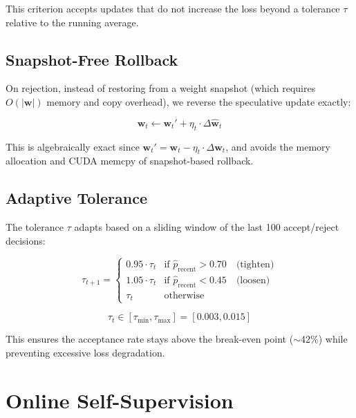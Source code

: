 \documentclass[conference]{IEEEtran}
\begin{document}
This criterion accepts updates that do not increase the loss beyond a tolerance $\tau$ relative to the running average.

\subsection{Snapshot-Free Rollback}

On rejection, instead of restoring from a weight snapshot (which requires $O(|\mathbf{w}|)$ memory and copy overhead), we reverse the speculative update exactly:

\begin{equation}
\mathbf{w}_t \gets \mathbf{w}_t' + \eta_t \cdot \Delta\hat{\mathbf{w}}_t
\label{eq:rollback}
\end{equation}

This is algebraically exact since $\mathbf{w}_t' = \mathbf{w}_t - \eta_t \cdot \Delta\hat{\mathbf{w}}_t$, and avoids the memory allocation and CUDA memcpy of snapshot-based rollback.

\subsection{Adaptive Tolerance}

The tolerance $\tau$ adapts based on a sliding window of the last 100 accept/reject decisions:

\begin{equation}
\tau_{t+1} = \begin{cases}
0.95 \cdot \tau_t & \text{if } \hat{p}_{\mathrm{recent}} > 0.70 \quad \text{(tighten)} \\
1.05 \cdot \tau_t & \text{if } \hat{p}_{\mathrm{recent}} < 0.45 \quad \text{(loosen)} \\
\tau_t & \text{otherwise}
\end{cases}
\label{eq:adaptive_tol}
\end{equation}

\begin{equation}
\tau_t \in [\tau_{\min}, \tau_{\max}] = [0.003, 0.015]
\label{eq:tol_clamp}
\end{equation}

This ensures the acceptance rate stays above the break-even point ($\sim$42\%) while preventing excessive loss degradation.

\section{Online Self-Supervision}
\end{document}
